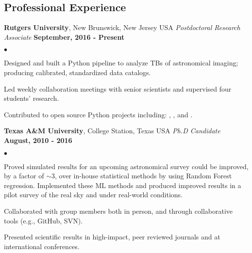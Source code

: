 \documentclass[margin,line, 11pt]{res}
\newenvironment{list2}{
  \begin{list}{$\bullet$}{%
      \setlength{\itemsep}{0in}
      \setlength{\parsep}{0in} \setlength{\parskip}{0in}
      \setlength{\topsep}{0in} \setlength{\partopsep}{0in}
      \setlength{\leftmargin}{0.2in}}}{\end{list}}
\begin{document}
\begin{resume}
\section{Professional \newline Experience}
\textbf{Rutgers University}, New Brunswick, New Jersey USA \newline
\textit{Postdoctoral Research Associate} \hfill \textbf{September, 2016 - Present}\newline
    \begin{list2}
    	\vspace*{-5mm}
    	\item Designed and built a Python pipeline to analyze TBs of astronomical imaging; producing calibrated, standardized data catalogs.
    	\item Led weekly collaboration meetings with senior scientists and supervised four students' research.
    	\item Contributed to open source Python projects including: \href{https://github.com/boada/photometrypipeline}{}, \href{http://astlib.sourceforge.net/}{}, and \href{https://github.com/boada/easyGalaxy}{}.
    \end{list2}
\vspace*{-3mm}

\textbf{Texas A\&M University}, College Station, Texas USA\newline
\textit{Ph.D Candidate} \hfill \textbf{August, 2010 - 2016}\newline
    \begin{list2}
    	\vspace*{-5mm}
      \item Proved simulated results for an upcoming astronomical survey could be improved, by a factor of $\sim3$, over in-house statistical methods by using Random Forest regression. Implemented these ML methods and produced improved results in a pilot survey of the real sky and under real-world conditions.
    	\item Collaborated with group members both in person, and through collaborative tools (e.g., GitHub, SVN).
    	\item Presented scientific results in high-impact, peer reviewed journals and at international conferences.
    \end{list2}
\vspace*{-3mm}


\end{resume}
\end{document}
